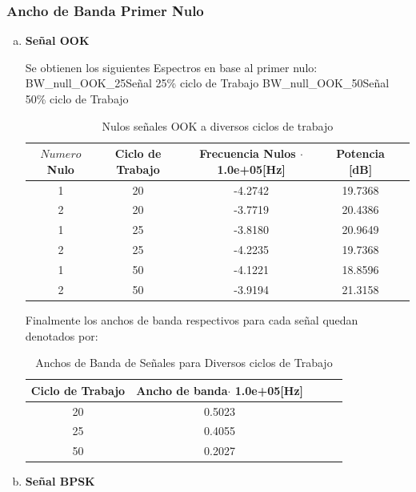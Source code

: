 \documentclass[letterpaper, titlepage]{article}
\begin{document}
		\subsubsection{Ancho de Banda Primer Nulo}
			\begin{enumerate}[a)]
				\item \textbf{Señal OOK}
				
					Se obtienen los siguientes Espectros en base al primer nulo:\\
							 {BW_null_OOK_25}{\label{fig:sim}}{Señal 25\% ciclo de Trabajo}
							 {BW_null_OOK_50}{\label{fig:sim}}{Señal 50\% ciclo de Trabajo}\\
	 

					\begin{table}[ht]
						\centering
						\begin{tabular}{c c c c c}
							$Numero$ Nulo & Ciclo de Trabajo & Frecuencia Nulos $\cdot$ 1.0e+05[Hz] & Potencia [dB]\\
							\hline
							1 & 20 & -4.2742 & 19.7368  \\
							2 & 20 & -3.7719 & 20.4386	\\
							1 & 25 & -3.8180 & 20.9649   \\
							2 & 25 & -4.2235 & 19.7368   \\
							1 & 50 & -4.1221 & 18.8596  \\
							2 & 50 & -3.9194 & 21.3158   \\
		
						\end{tabular}
						\caption{Nulos señales OOK a diversos ciclos de trabajo}
						\label{tab:tabla1}
	
					\end{table}
					\begin{center}
						Finalmente los anchos de banda respectivos para cada señal quedan denotados por:
					\end{center}

					\begin{table}[ht]
						\centering
						\begin{tabular}{c c c c c}
							Ciclo de Trabajo & Ancho de banda$\cdot$ 1.0e+05[Hz] \\
							\hline
							20 & 0.5023   \\
							25 & 0.4055	  \\
							50 & 0.2027   \\
						\end{tabular}
						\caption{Anchos de Banda de Señales para Diversos ciclos de Trabajo}
						\label{tab:tabla1}
					\end{table}
					\newpage
				\item \textbf{Señal BPSK}
				

\end{enumerate}
\end{document}
